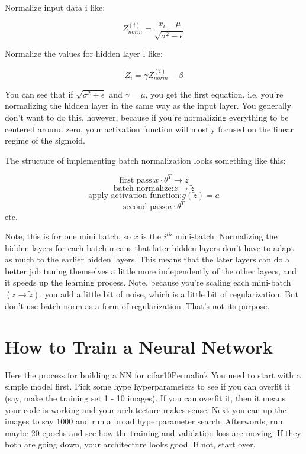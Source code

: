Normalize input data i like:


\begin{equation}
    Z_{norm}^{(i)} = \frac{x_i-\mu}{\sqrt{\sigma^2-\epsilon}}
\end{equation}


Normalize the values for hidden layer l like:

\begin{equation}
\widetilde{Z}_i = \gamma Z_{norm}^{(i)} - \beta
\end{equation}

You can see that if $\sqrt{\sigma^2 + \epsilon}$ and $\gamma = \mu$, you get the first equation, i.e. you're normalizing the hidden layer in the same way as the input layer. You generally don't want to do this, however, because if you're normalizing everything to be centered around zero, your activation function will mostly focused on the linear regime of the sigmoid.

The structure of implementing batch normalization looks something like this:

$$\text{first pass:} x \cdot \theta^T \rightarrow z$$
$$\text{batch normalize:} z \rightarrow \widetilde{z}$$ 
$$\text{apply activation function:} g(\widetilde{z}) = a$$
$$\text{second pass:} a \cdot \theta^T$$     
etc.

Note, this is for one mini batch, so $x$ is the $i^{th}$ mini-batch. Normalizing the hidden layers for each batch means that later hidden layers don't have to adapt as much to the earlier hidden layers. This means that the later layers can do a better job tuning themselves a little more independently of the other layers, and it speeds up the learning process. Note, because you're scaling each mini-batch $(z \rightarrow \widetilde{z})$, you add a little bit of noise, which is a little bit of regularization. But don't use batch-norm as a form of regularization. That's not its purpose.

\section{How to Train a Neural Network}
Here the process for building a NN for cifar10Permalink
You need to start with a simple model first. Pick some hype hyperparameters to see if you can overfit it (say, make the training set 1 - 10 images). If you can overfit it, then it means your code is working and your architecture makes sense. Next you can up the images to say 1000 and run a broad hyperparameter search. Afterwords, run maybe 20 epochs and see how the training and validation loss are moving. If they both are going down, your architecture looks good. If not, start over.

